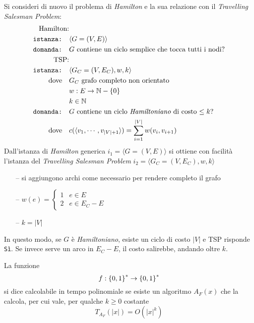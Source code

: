 Si consideri di nuovo il problema di \emph{Hamilton} e la sua relazione con il \emph{Travelling Salesman Problem}:
\begin{align*}
    \text{Hamilton:} & \quad \\
    \texttt{istanza:} \quad & \langle G=(V,E) \rangle \\
    \texttt{domanda:} \quad & G \text{ contiene un ciclo semplice che tocca tutti i nodi?} \\
    \text{TSP:} & \quad \\
    \texttt{istanza:} \quad & \langle G_C=(V,E_C), w, k \rangle \\
    \text{dove} \quad & G_C \text{ grafo completo non orientato} \\
    & w : E \to \mathbb{N} - \left\{ 0 \right\} \\
    & k \in \mathbb{N} \\
    \texttt{domanda:} \quad & G \text{ contiene un ciclo \emph{Hamiltoniano} di costo $\leq k$?} \\
    \text{dove} \quad &  c(\langle v_1, \cdots, v_{|V|+1} \rangle) = \sum_{i=1}^{|V|} w(v_i, v_{i+1} )  \\
\end{align*}
Dall'istanza di \emph{Hamilton} generica 
$i_1 = \langle G=(V,E) \rangle$
si ottiene con facilità l'istanza del \emph{Travelling Salesman Problem}
$i_2 = \langle G_C=(V,E_C), w, k \rangle$
\begin{itemize}[parsep=0pt,partopsep=0pt,topsep=2pt]
    \item[--] si aggiungono archi come necessario per rendere completo il grafo
    \item[--] $w(e) = 
        \begin{cases}
            1 & e \in E \\
            2 & e \in E_C - E
        \end{cases}
        $
    \item[--] $k = |V|$
\end{itemize}
In questo modo, se $G$ è \emph{Hamiltoniano}, esiste un ciclo di costo $|V|$ e TSP risponde \texttt{Sì}. Se invece serve un arco in $E_C - E$, il costo salirebbe, andando oltre $k$.

\begin{definition}
    \label{def:funzionectp}
    La funzione
    \begin{equation*}
        f : \left\{0,1\right\}^{*} \to \left\{0,1\right\}^{*} 
    \end{equation*}
    si dice calcolabile in tempo polinomiale se esiste un algoritmo $A_F (x)$ che la calcola, per cui vale, per qualche $k \geq 0$ costante
    \begin{equation*}
        T_{A_{F}} (|x|) = O \left( |x|^{k} \right)
    \end{equation*}
\end{definition}

